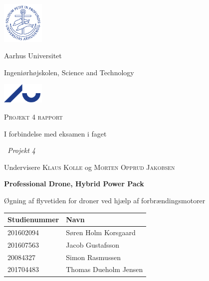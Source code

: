 \begin{titlepage}
	\begin{center}
	\includegraphics[width=2cm]{./figurer/segl.pdf}
	\hfill
	\parbox{.5\linewidth}{%
		\centering
		Aarhus Universitet\par
		\vspace{.05\textheight}
		Ingeniørhøjskolen, Science and Technology\par
	}
	\hfill
	\includegraphics[width=2cm]{./figurer/au.pdf}
	\par
		\vspace{.05\textheight}
		{\LARGE\scshape Projekt 4 rapport\par}
		\vspace{.05\textheight}
		I forbindelse med eksamen i faget\par
		{\itshape\ Projekt 4\par}
		\vspace{.05\textheight}
		Undervisere \textsc{Klaus Kolle} og \textsc{Morten Opprud Jakobsen}\par
		\vspace{.05\textheight}
		{\Huge\bfseries Professional Drone, Hybrid Power Pack \par}
		\vspace{.05\textheight}
		{\large Øgning af flyvetiden for droner ved hjælp af forbrændingsmotorer\par}
		\vfill
		\noindent\begin{tabularx}{\textwidth}{p{5cm}p{10cm}}
			\toprule
			Studienummer & Navn \\
			\midrule
                        201602094 & Søren Holm Korsgaard \\
                        201607563 & Jacob Gustafsson \\
                        20084327 & Simon Rasmussen \\
                        201704483 & Thomas Dueholm Jensen \\
  \bottomrule
  \end{tabularx}
\end{center}
\end{titlepage}



